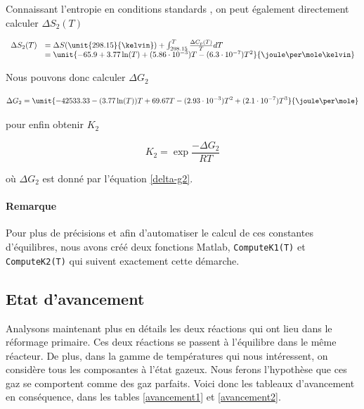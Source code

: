 Connaissant l'entropie en conditions standards \cite{atkins}, on peut
également directement calculer $\Delta S_2(T)$

$$
	\begin{array}{rl}
		 	\Delta S_2(T)	&= \Delta S(\unit{298.15}{\kelvin}) 
											 + \int_{298.15}^{T} \frac{\Delta C_p(T)}{T}dT \\
										&= \unit{-65.9 + 3.77 \ln(T) +(5.86\cdot 10^{-3})T -(6.3 \cdot 10^{-7})T^2}{\joule\per\mole\kelvin}
	\end{array}
$$	

Nous pouvons donc calculer $\Delta G_2$
 
 \begin{equation}
	\Delta G_2= \unit{-42533.33 - (3.77 \ln(T))T +69.67 T -(2.93 \cdot 10^{-3})T^2 + (2.1\cdot 10^{-7})T^3}{\joule\per\mole} 
	\label{delta-g2}
 \end{equation}
 
pour enfin obtenir $K_2$

	$$K_2 = \exp{\frac{-\Delta G_2}{RT}}$$

où $\Delta G_2$ est donné par l'équation \ref{delta-g2}.

\paragraph{Remarque} Pour plus de précisions et afin d'automatiser le calcul
de ces constantes d'équilibres, nous avons créé deux fonctions Matlab, \lstinline{ComputeK1(T)}
et \lstinline{ComputeK2(T)} qui suivent exactement cette démarche.

\subsection{Etat d'avancement}
Analysons maintenant plus en détails les deux réactions qui ont lieu dans le réformage primaire.
Ces deux réactions se passent à l'équilibre dans le même réacteur. 
De plus, dans la gamme de températures qui nous intéressent, on considère tous les composantes à l'état gazeux.
Nous ferons l'hypothèse que ces gaz se comportent comme des gaz parfaits.
Voici donc les tableaux d'avancement en conséquence, dans les tables \ref{avancement1} et \ref{avancement2}.
  
